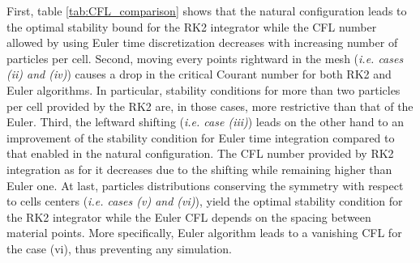 First, table \ref{tab:CFL_comparison} shows that the natural configuration leads to the optimal stability bound for the RK2 integrator while the CFL number allowed by using Euler time discretization decreases with increasing number of particles per cell.
Second, moving every points rightward in the mesh (\textit{i.e. cases (ii) and (iv)}) causes a drop in the critical Courant number for both RK2 and Euler algorithms. In particular, stability conditions for more than two particles per cell provided by the RK2 are, in those cases, more restrictive than that of the Euler.
Third, the leftward shifting (\textit{i.e. case (iii)}) leads on the other hand to an improvement of the stability condition for Euler time integration compared to that enabled in the natural configuration. The CFL number provided by RK2 integration as for it decreases due to the shifting while remaining higher than Euler one.
At last, particles distributions conserving the symmetry with respect to cells centers (\textit{i.e. cases (v) and (vi)}), yield the optimal stability condition for the RK2 integrator while the Euler CFL depends on the spacing between material points. More specifically, Euler algorithm leads to a vanishing CFL for the case (vi), thus preventing any simulation.

